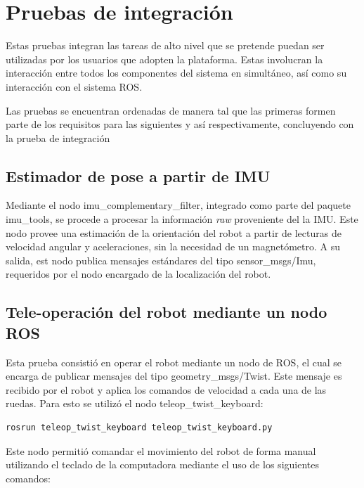 \section{Pruebas de integración}

Estas pruebas integran las tareas de alto nivel que se pretende puedan ser utilizadas por los usuarios que adopten la plataforma. Estas involucran la interacción entre todos los componentes del sistema en simultáneo, así como su interacción con el sistema ROS.

Las pruebas se encuentran ordenadas de manera tal que las primeras formen parte de los requisitos para las siguientes y así respectivamente, concluyendo con la prueba de integración

\subsection{Estimador de pose a partir de IMU}

Mediante el nodo imu\_complementary\_filter, integrado como parte del paquete imu\_tools\protect\footnotemark, se procede a procesar la información \textit{raw} proveniente del la IMU. Este nodo provee una estimación de la orientación del robot a partir de lecturas de velocidad angular y aceleraciones, sin la necesidad de un magnetómetro. A su salida, est nodo publica mensajes estándares del tipo sensor\_msgs/Imu\protect\footnotemark, requeridos por el nodo encargado de la localización del robot.


\subsection{Tele-operación del robot mediante un nodo ROS}

Esta prueba consistió en operar el robot mediante un nodo de ROS, el cual se encarga de publicar mensajes del tipo geometry\_msgs/Twist\protect\footnotemark. Este mensaje es recibido por el robot y aplica los comandos de velocidad a cada una de las ruedas. Para esto se utilizó el nodo teleop\_twist\_keyboard:

\begin{lstlisting}[basicstyle=\ttfamily, keywords={}]
rosrun teleop_twist_keyboard teleop_twist_keyboard.py
\end{lstlisting}

Este nodo permitió comandar el movimiento del robot de forma manual utilizando el teclado de la computadora mediante el uso de los siguientes comandos:

